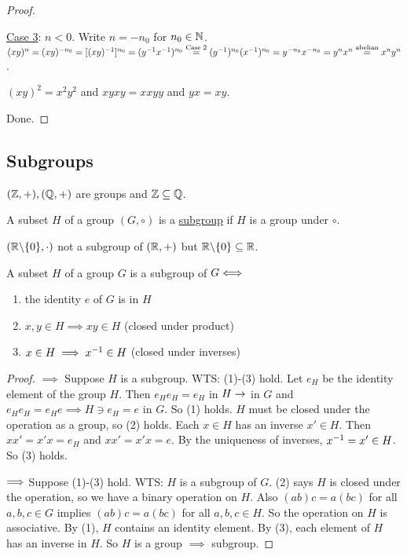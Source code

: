\documentclass[]{article}
\begin{document}
\begin{proof}
\begin{enumerate}
				\ul{Case 3}: $n<0$. Write $n=-n_0$ for $n_0\in\mathbb{N}$. $(xy)^n = (xy)^{-n_0} = [(xy)^{-1}]^{n_0} = (y^{-1} x^{-1})^{n_0} \overset{\text{Case 2}}{=} (y^{-1})^{n_0}(x^{-1})^{n_0} = y^{-n_0} x^{-n_0} = y^nx^n \overset{\text{abelian}}{=} x^ny^n$.
			\begin{example}
				$(xy)^2 = x^2 y^2$ and $xyxy = xxyy$ and $yx = xy$.
			\end{example}
	\end{enumerate}
	Done.
\end{proof}

\subsection{Subgroups}

\begin{example}
	$(\mathbb{Z},+),(\mathbb{Q},+)$ are groups and $\mathbb{Z}\subseteq\mathbb{Q}$.
\end{example}
\begin{definition}
	A subset $H$ of a group $(G,\circ)$ is a \ul{subgroup} if $H$ is a group under $\circ$.
\end{definition}
\begin{example}
	$(\mathbb{R}\backslash\{0\},\cdot)$ not a subgroup of $(\mathbb{R},+)$ but $\mathbb{R}\backslash\{0\}\subseteq\mathbb{R}$.
\end{example}
\begin{proposition}
	A subset $H$ of a group $G$ is a subgroup of $G \Longleftrightarrow$
	\begin{enumerate}
		\item the identity $e$ of $G$ is in $H$
		\item $x,y\in H \implies xy\in H$ (closed under product)
		\item $x\in H \implies x^{-1}\in H$ (closed under inverses)
	\end{enumerate}
\end{proposition}
\begin{proof}
	\ul{$\implies$} Suppose $H$ is a subgroup.
	WTS: (1)-(3) hold.
	Let $e_H$ be the identity element of the group $H$. Then $e_He_H = e_H$ in $H \rightarrow$ in $G$ and $e_H e_H = e_H e \implies H\ni e_H = e$ in $G$. So (1) holds.
	$H$ must be closed under the operation as a group, so (2) holds.
	Each $x\in H$ has an inverse $x'\in H$. Then $xx' = x'x = e_H$ and $xx' = x'x = e$. By the uniqueness of inverses, $x^{-1} = x'\in H$. So (3) holds.

	\ul{$\Longrightarrow$} Suppose (1)-(3) hold. WTS: $H$ is a subgroup of $G$.
	(2) says $H$ is closed under the operation, so we have a binary operation on $H$.
	Also $(ab)c = a(bc)$ for all $a,b,c\in G$ implies $(ab)c = a(bc)$ for all $a,b,c\in H$. So the operation on $H$ is associative.
	By (1), $H$ contains an identity element. By (3), each element of $H$ has an inverse in $H$.
	So $H$ is a group $\implies$ subgroup.
\end{proof}
\end{document}

